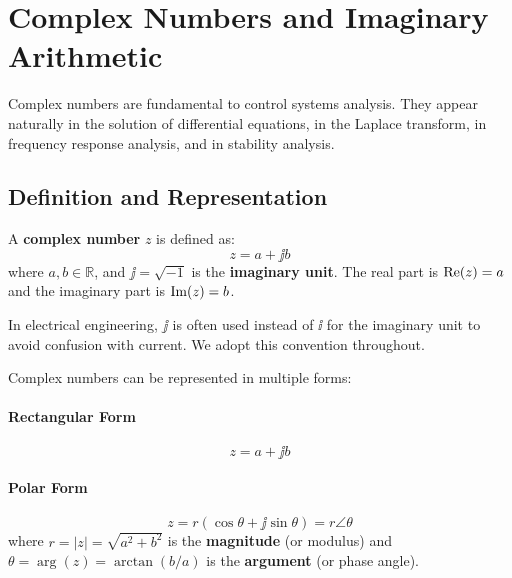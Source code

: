 
\chapter{Complex Numbers and Imaginary Arithmetic}
\label{ch:complex_numbers}

Complex numbers are fundamental to control systems analysis. They appear naturally in the solution of differential equations, in the Laplace transform, in frequency response analysis, and in stability analysis.

\section{Definition and Representation}

\begin{definitionbox}[title=Definition 0.1: Complex Number]
A \textbf{complex number} $z$ is defined as:
\begin{equation}
z = a + \jj b
\end{equation}
where $a, b \in \mathbb{R}$, and $\jj = \sqrt{-1}$ is the \textbf{imaginary unit}. The real part is $\operatorname{Re}(z) = a$ and the imaginary part is $\operatorname{Im}(z) = b$.
\end{definitionbox}

\begin{note}
In electrical engineering, $\jj$ is often used instead of $\ii$ for the imaginary unit to avoid confusion with current. We adopt this convention throughout.
\end{note}

Complex numbers can be represented in multiple forms:

\subsubsection{Rectangular Form}
\begin{equation}
z = a + \jj b
\end{equation}

\subsubsection{Polar Form}
\begin{equation}
z = r(\cos\theta + \jj\sin\theta) = r \angle \theta
\end{equation}
where $r = |z| = \sqrt{a^2 + b^2}$ is the \textbf{magnitude} (or modulus) and $\theta = \arg(z) = \arctan(b/a)$ is the \textbf{argument} (or phase angle).

